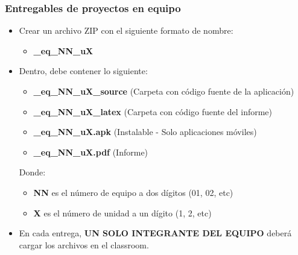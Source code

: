 \begin{frame}
\frametitle{Entregables de proyectos en equipo}
    \begin{itemize}
    \item Crear un archivo ZIP con el siguiente formato de nombre:
    \begin{itemize}
        \item \textbf{\clavegrupo\_eq\_NN\_uX}
    \end{itemize}
    \item Dentro, debe contener lo siguiente:
\begin{itemize}
\item \textbf{\clavegrupo\_eq\_NN\_uX\_source} (Carpeta con c\'odigo fuente de la aplicaci\'on)
\item \textbf{\clavegrupo\_eq\_NN\_uX\_latex} (Carpeta con c\'odigo fuente del informe)
\item \textbf{\clavegrupo\_eq\_NN\_uX.apk} (Instalable - Solo aplicaciones móviles)
\item \textbf{\clavegrupo\_eq\_NN\_uX.pdf} (Informe)
\end{itemize}
Donde:
\begin{itemize}
\item \textbf{NN} es el n\'umero de equipo a dos d\'igitos (01, 02, etc)
\item \textbf{X} es el n\'umero de unidad a un d\'igito (1, 2, etc)
\end{itemize}
\item En cada entrega, \textbf{UN SOLO INTEGRANTE DEL EQUIPO} deberá cargar los archivos en el classroom.
\end{itemize}


\end{frame}





